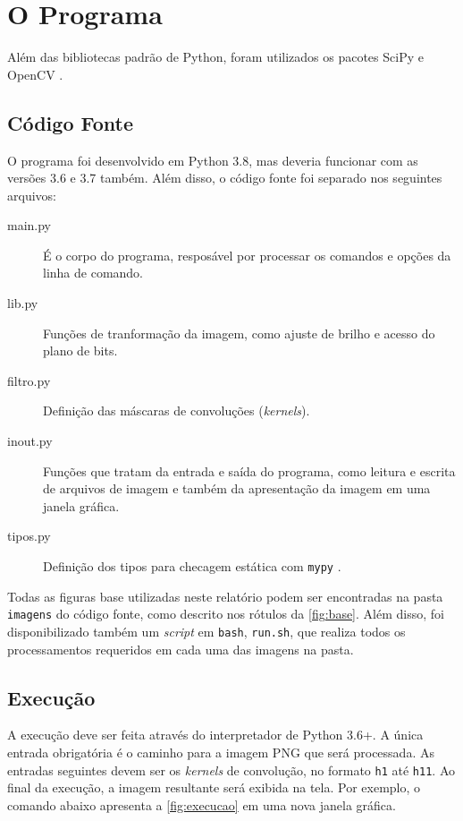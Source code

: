 \section{O Programa}

Além das bibliotecas padrão de Python, foram utilizados os pacotes SciPy \autocite{ref:scipy} e OpenCV \autocite{ref:opencv}.

\subsection{Código Fonte}

    O programa foi desenvolvido em Python 3.8, mas deveria funcionar com as versões 3.6 e 3.7 também. Além disso, o código fonte foi separado nos seguintes arquivos:

    \begin{description}
        \item[main.py] É o corpo do programa, resposável por processar os comandos e opções da linha de comando.

        \item[lib.py] Funções de tranformação da imagem, como ajuste de brilho e acesso do plano de bits.

        \item[filtro.py] Definição das máscaras de convoluções (\textit{kernels}).

        \item[inout.py] Funções que tratam da entrada e saída do programa, como leitura e escrita de arquivos de imagem e também da apresentação da imagem em uma janela gráfica.

        \item[tipos.py] Definição dos tipos para checagem estática com \texttt{mypy} \autocite{ref:mypy}.
    \end{description}

    Todas as figuras base utilizadas neste relatório podem ser encontradas na pasta \texttt{imagens} do código fonte, como descrito nos rótulos da \cref{fig:base}. Além disso, foi disponibilizado também um \textit{script} em \texttt{bash}, \texttt{run.sh}, que realiza todos os processamentos requeridos em cada uma das imagens na pasta.

\subsection{Execução}

    A execução deve ser feita através do interpretador de Python 3.6+. A única entrada obrigatória é o caminho para a imagem PNG que será processada. As entradas seguintes devem ser os \textit{kernels} de convolução, no formato \texttt{h1} até \texttt{h11}. Ao final da execução, a imagem resultante será exibida na tela. Por exemplo, o comando abaixo apresenta a \cref{fig:execucao} em uma nova janela gráfica.

